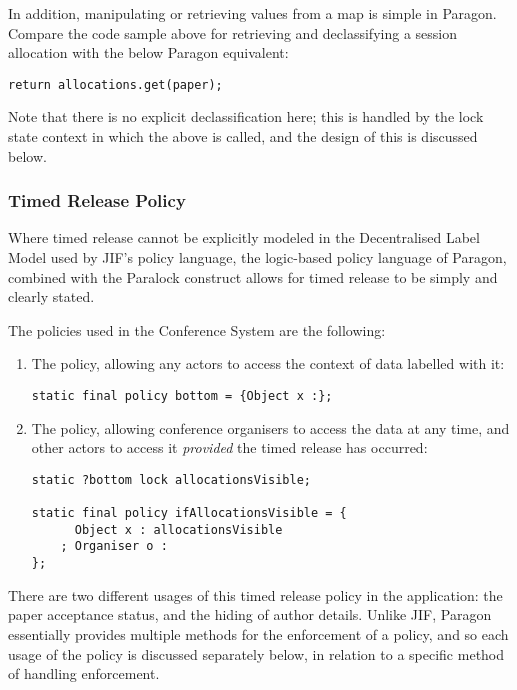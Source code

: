 In addition, manipulating or retrieving values from a map is simple in Paragon. Compare the code sample above for retrieving and declassifying a session allocation with the below Paragon equivalent:

\begin{verbatim}
return allocations.get(paper);
\end{verbatim}

Note that there is no explicit declassification here; this is handled by the lock state context in which the above is called, and the design of this is discussed below.

\subsubsection{Timed Release Policy}

Where timed release cannot be explicitly modeled in the Decentralised Label Model used by JIF's policy language, the logic-based policy language of Paragon, combined with the Paralock construct allows for timed release to be simply and clearly stated.

The policies used in the Conference System are the following:

\begin{enumerate}
	\item The  policy, allowing any actors to access the context of data labelled with it:
	
	\begin{verbatim}
static final policy bottom = {Object x :};
	\end{verbatim}
	
	\item The  policy, allowing conference organisers to access the data at any time, and other actors to access it \textit{provided} the timed release has occurred:
	
	\begin{verbatim}
static ?bottom lock allocationsVisible;

static final policy ifAllocationsVisible = {
 	  Object x : allocationsVisible 
	; Organiser o :
};
	\end{verbatim}
\end{enumerate}

There are two different usages of this timed release policy in the application: the paper acceptance status, and the hiding of author details. Unlike JIF, Paragon essentially provides multiple methods for the enforcement of a policy, and so each usage of the policy is discussed separately below, in relation to a specific method of handling enforcement.

